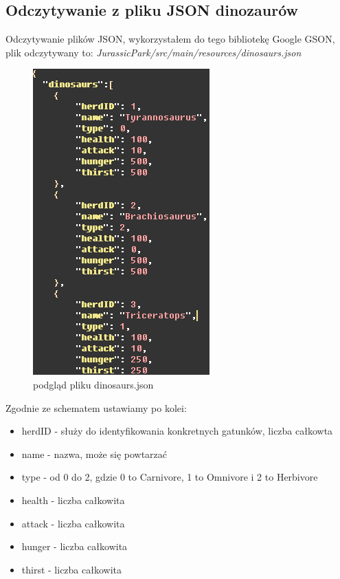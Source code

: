 \subsection{Odczytywanie z pliku JSON dinozaurów}

Odczytywanie plików JSON, wykorzystałem do tego bibliotekę Google GSON, plik odczytywany to: \textit{JurassicPark/src/main/resources/dinosaurs.json}

\begin{figure}[h!]
    \centering
    \includegraphics{images/json.png}
    \caption{podgląd pliku dinosaurs.json}
    \label{fig:json}
\end{figure}

Zgodnie ze schematem ustawiamy po kolei:
\begin{itemize}
    \item herdID - służy do identyfikowania konkretnych gatunków, liczba całkowta
    \item name - nazwa, może się powtarzać
    \item type - od 0 do 2, gdzie 0 to Carnivore, 1 to Omnivore i 2 to Herbivore
    \item health - liczba całkowita
    \item attack - liczba całkowita
    \item hunger - liczba całkowita
    \item thirst - liczba całkowita
\end{itemize}

